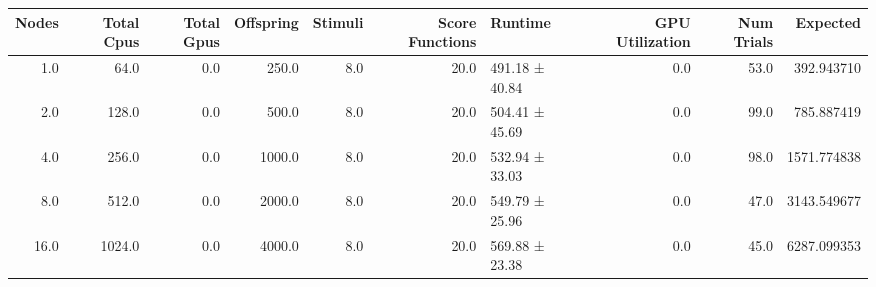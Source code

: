 \begin{tabular}{rrrrrrlrrr}
\toprule
 Nodes &  Total Cpus &  Total Gpus &  Offspring &  Stimuli &  Score Functions &        Runtime &  GPU Utilization &  Num Trials &    Expected \\
\midrule
   1.0 &        64.0 &         0.0 &      250.0 &      8.0 &             20.0 & 491.18 ± 40.84 &              0.0 &        53.0 &  392.943710 \\
   2.0 &       128.0 &         0.0 &      500.0 &      8.0 &             20.0 & 504.41 ± 45.69 &              0.0 &        99.0 &  785.887419 \\
   4.0 &       256.0 &         0.0 &     1000.0 &      8.0 &             20.0 & 532.94 ± 33.03 &              0.0 &        98.0 & 1571.774838 \\
   8.0 &       512.0 &         0.0 &     2000.0 &      8.0 &             20.0 & 549.79 ± 25.96 &              0.0 &        47.0 & 3143.549677 \\
  16.0 &      1024.0 &         0.0 &     4000.0 &      8.0 &             20.0 & 569.88 ± 23.38 &              0.0 &        45.0 & 6287.099353 \\
\bottomrule
\end{tabular}
